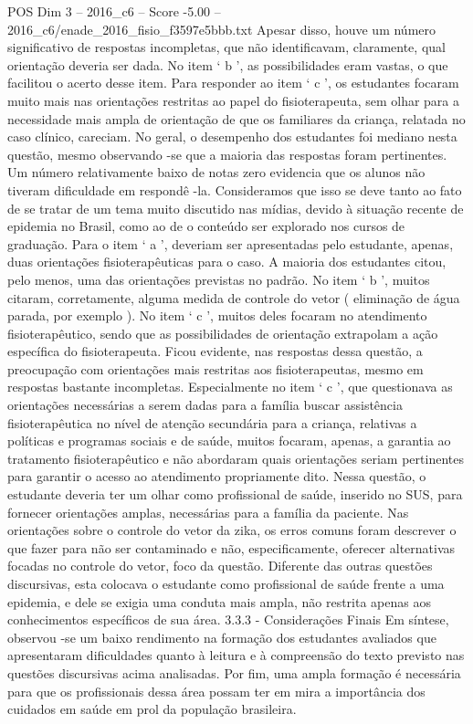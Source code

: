 \begin{textsample}{POS Dim 3 – 2016\_c6 – Score -5.00 – 2016\_c6/enade\_2016\_fisio\_f3597e5bbb.txt}
Apesar disso, houve um número significativo de respostas incompletas, que não identificavam, claramente, qual orientação deveria ser dada.
No item ‘ b ’, as possibilidades eram vastas, o que facilitou o acerto desse item.
Para responder ao item ‘ c ’, os estudantes focaram muito mais nas orientações restritas ao papel do fisioterapeuta, sem olhar para a necessidade mais ampla de orientação de que os familiares da criança, relatada no caso clínico, careciam.
No geral, o desempenho dos estudantes foi mediano nesta questão, mesmo observando -se que a maioria das respostas foram pertinentes.
Um número relativamente baixo de notas zero evidencia que os alunos não tiveram dificuldade em respondê -la.
Consideramos que isso se deve tanto ao fato de se tratar de um tema muito discutido nas mídias, devido à situação recente de epidemia no Brasil, como ao de o conteúdo ser explorado nos cursos de graduação.
Para o item ‘ a ’, deveriam ser apresentadas pelo estudante, apenas, duas orientações fisioterapêuticas para o caso.
A maioria dos estudantes citou, pelo menos, uma das orientações previstas no padrão.
No item ‘ b ’, muitos citaram, corretamente, alguma medida de controle do vetor ( eliminação de água parada, por exemplo ).
No item ‘ c ’, muitos deles focaram no atendimento fisioterapêutico, sendo que as possibilidades de orientação extrapolam a ação específica do fisioterapeuta.
Ficou evidente, nas respostas dessa questão, a preocupação com orientações mais restritas aos fisioterapeutas, mesmo em respostas bastante incompletas.
Especialmente no item ‘ c ’, que questionava as orientações necessárias a serem dadas para a família buscar assistência fisioterapêutica no nível de atenção secundária para a criança, relativas a políticas e programas sociais e de saúde, muitos focaram, apenas, a garantia ao tratamento fisioterapêutico e não abordaram quais orientações seriam pertinentes para garantir o acesso ao atendimento propriamente dito.
Nessa questão, o estudante deveria ter um olhar como profissional de saúde, inserido no SUS, para fornecer orientações amplas, necessárias para a família da paciente.
Nas orientações sobre o controle do vetor da zika, os erros comuns foram descrever o que fazer para não ser contaminado e não, especificamente, oferecer alternativas focadas no controle do vetor, foco da questão.
Diferente das outras questões discursivas, esta colocava o estudante como profissional de saúde frente a uma epidemia, e dele se exigia uma conduta mais ampla, não restrita apenas aos conhecimentos específicos de sua área. 3.3.3 - Considerações Finais Em síntese, observou -se um baixo rendimento na formação dos estudantes avaliados que apresentaram dificuldades quanto à leitura e à compreensão do texto previsto nas questões discursivas acima analisadas.
Por fim, uma ampla formação é necessária para que os profissionais dessa área possam ter em mira a importância dos cuidados em saúde em prol da população brasileira.

\end{textsample}
